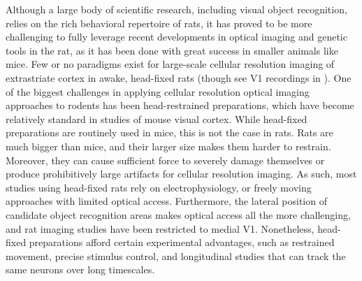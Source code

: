 Although a large body of scientific research, including visual object recognition, relies on the rich behavioral repertoire of rats, it has proved to be more challenging to fully leverage recent developments in optical imaging and genetic tools in the rat, as it has been done with great success in smaller animals like mice\cite{Luo2018}. Few or no paradigms exist for large-scale cellular resolution imaging of extrastriate cortex in awake, head-fixed rats (though see V1 recordings in \cite{Greenberg2008}). One of the biggest challenges in applying cellular resolution optical imaging approaches to rodents has been head-restrained preparations, which have become relatively standard in studies of mouse visual cortex. While head-fixed preparations are routinely used in mice, this is not the case in rats. Rats are much bigger than mice, and their larger size makes them harder to restrain. Moreover, they can cause sufficient force to severely damage themselves or produce prohibitively large artifacts for cellular resolution imaging. As such, most studies using head-fixed rats rely on electrophysiology, or freely moving approaches with limited optical access\cite{Scott2013}. Furthermore, the lateral position of candidate object recognition areas makes optical access all the more challenging, and rat imaging studies have been restricted to medial V1\cite{Greenberg2008, Ohki2005}. Nonetheless, head-fixed preparations afford certain experimental advantages, such as restrained movement, precise stimulus control, and longitudinal studies that can track the same neurons over long timescales. 



